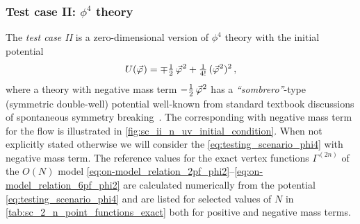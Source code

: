 \subsubsection{Test case II: \texorpdfstring{$\phi^4$}{phi**4} theory}
\label{subsubsec:sc2}
The \textit{test case II} is a zero-dimensional version of $\phi^4$ theory with the \uv{} initial potential
	\begin{align}
		U ( \vec{\varphi} \mskip1.0mu ) = \mp \tfrac{1}{2} \, \vec{\varphi}^{\mskip1.0mu 2} + \tfrac{1}{4!} \, ( \vec{\varphi}^{\mskip1.0mu 2} )^2 \, ,	\label{eq:testing_scenario_phi4}
	\end{align}
where a theory with negative mass term $-\tfrac{1}{2} \, \vec{\varphi}^{\mskip1.0mu 2}$ has a \textit{``sombrero''}-type (symmetric double-well) potential well-known from standard textbook discussions of spontaneous symmetry breaking~\cite{Goldstone:1961eq,Goldstone:1962es}.
The corresponding \ic{} with negative mass term for the \frg{} flow is illustrated in \cref{fig:sc_ii_n_uv_initial_condition}.
When not explicitly stated otherwise we will consider the \ic{} \eqref{eq:testing_scenario_phi4} with negative mass term.
The reference values for the exact \ir{} \ipi{} vertex functions $\Gamma^{(2n)}$ of the $O(N)$ model \eqref{eq:on-model_relation_2pf_phi2}\nolinebreak[3]--\nolinebreak[2]\eqref{eq:on-model_relation_6pf_phi2} are calculated numerically from the \uv{} potential \eqref{eq:testing_scenario_phi4} and are listed for selected values of $N$ in \cref{tab:sc_2_n_point_functions_exact} both for positive and negative mass terms.

